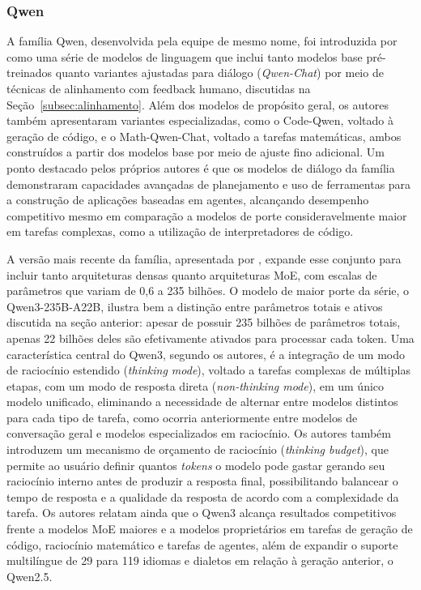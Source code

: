 \subsubsection{Qwen}

A família Qwen, desenvolvida pela equipe de mesmo nome, foi introduzida por \citet{qwentechreport2023} como uma série de modelos de linguagem que inclui tanto modelos base pré-treinados quanto variantes ajustadas para diálogo (\textit{Qwen-Chat}) por meio de técnicas de alinhamento com feedback humano, discutidas na Seção~\ref{subsec:alinhamento}. Além dos modelos de propósito geral, os autores também apresentaram variantes especializadas, como o Code-Qwen, voltado à geração de código, e o Math-Qwen-Chat, voltado a tarefas matemáticas, ambos construídos a partir dos modelos base por meio de ajuste fino adicional. Um ponto destacado pelos próprios autores é que os modelos de diálogo da família demonstraram capacidades avançadas de planejamento e uso de ferramentas para a construção de aplicações baseadas em agentes, alcançando desempenho competitivo mesmo em comparação a modelos de porte consideravelmente maior em tarefas complexas, como a utilização de interpretadores de código.

A versão mais recente da família, apresentada por \citet{qwen3team2025}, expande esse conjunto para incluir tanto arquiteturas densas quanto arquiteturas MoE, com escalas de parâmetros que variam de 0,6 a 235 bilhões. O modelo de maior porte da série, o Qwen3-235B-A22B, ilustra bem a distinção entre parâmetros totais e ativos discutida na seção anterior: apesar de possuir 235 bilhões de parâmetros totais, apenas 22 bilhões deles são efetivamente ativados para processar cada token. Uma característica central do Qwen3, segundo os autores, é a integração de um modo de raciocínio estendido (\textit{thinking mode}), voltado a tarefas complexas de múltiplas etapas, com um modo de resposta direta (\textit{non-thinking mode}), em um único modelo unificado, eliminando a necessidade de alternar entre modelos distintos para cada tipo de tarefa, como ocorria anteriormente entre modelos de conversação geral e modelos especializados em raciocínio. Os autores também introduzem um mecanismo de orçamento de raciocínio (\textit{thinking budget}), que permite ao usuário definir quantos \textit{tokens} o modelo pode gastar gerando seu raciocínio interno antes de produzir a resposta final, possibilitando balancear o tempo de resposta e a qualidade da resposta de acordo com a complexidade da tarefa. Os autores relatam ainda que o Qwen3 alcança resultados competitivos frente a modelos MoE maiores e a modelos proprietários em tarefas de geração de código, raciocínio matemático e tarefas de agentes, além de expandir o suporte multilíngue de 29 para 119 idiomas e dialetos em relação à geração anterior, o Qwen2.5.

